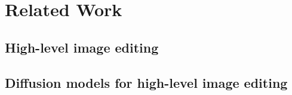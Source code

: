 \section{Related Work}\label{zero-shot-RW}

\subsection{High-level image editing}

\subsection{Diffusion models for high-level image editing}